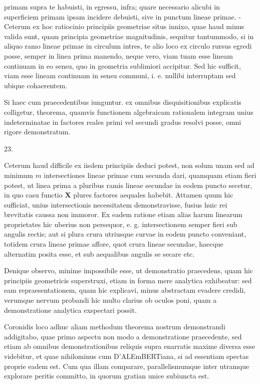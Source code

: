 \documentclass[10pt]{article}
\begin{document}
primam supra te habuisti, in egressu, infra; quare necessario alicubi in superficiem primam ipsam incidere debuisti, sive in punctum lineae primae. - Ceterum ex hoc ratiocinio principiis geometriae situs innixo, quae haud minus valida sunt, quam principia geometriae magnitudinis, sequitur tantummodo, si in aliquo ramo lineae primae in circulum intres, te alio loco ex circulo rursus egredi posse, semper in linea prima manendo, neque vero, viam tuam esse lineam continuam in eo sensu, quo in geometria sublimiori accipitur. Sed hic sufficit, viam esse lineam continuam in sensu communi, i. e. nullibi interruptam sed ubique cohaerentem.

Si haec cum praecedentibus iunguntur. ex omnibus disquisitionibus explicatis colligetur, theorema, quamvis functionem algebraicam rationalem integram unius indeterminatae in factores reales primi vel secundi gradus resolvi posse, omni rigore demonstratum.

23.

Ceterum haud difficile ex iisdem principiis deduci potest, non solum unam sed ad minimum \(m\) intersectiones lineae primae cum secunda dari, quamquam etiam fieri potest, ut linea prima a pluribus ramis lineae secundae in eodem puncto secetur, in quo casu functio \(\boldsymbol{X}\) plures factores aequales habebit. Attamen quum hic sufficiat, unius intersectionis necessitatem demonstravisse, fusius huic rei brevitatis caussa non immoror. Ex eadem ratione etiam alias harum linearum proprietates hic uberius non persequor, e. g. intersectionem semper fieri sub angulis rectis; aut si plura crura utriusque curvae in eodem puncto conveniant, totidem crura lineae primae affore, quot crura lineae secundae, haecque alternatim posita esse, et sub aequalibus angulis se secare etc.

Denique observo, minime impossibile esse, ut demonstratio praecedens, quam hic principiis geometricis superstruxi, etiam in forma mere analytica exhibeatur: sed eam repraesentationem, quam hic explicavi, minus abstractam evadere credidi, verumque nervum probandi hic multo clarius ob oculos poni, quam a demonstratione analytica exspectari possit.

Coronidis loco adhuc aliam methodum theorema nostrum demonstrandi addigitabo, quae primo aspectu non modo a demonstratione praecedente, sed etiam ab omnibus demonstrationibus reliquis supra enarratis maxime diversa esse videbitur, et quae nihilominus cum D'ALEmBERTiana, si ad essentiam spectas proprie eadem est. Cum qua illam comparare, parallelismumque inter utramque explorare peritis committo, in quorum gratian unice subiuncta est.
\end{document}
